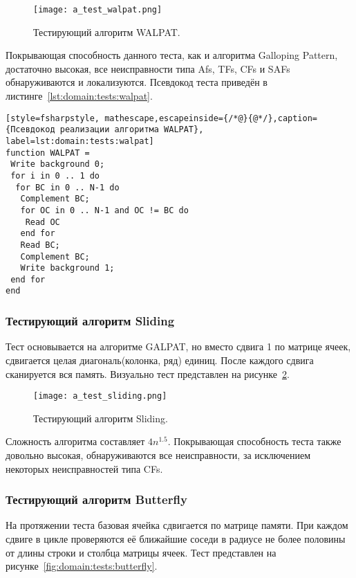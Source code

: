 \begin{figure}[ht]
\centering
  \texttt{[image: a\_test\_walpat.png]}  
  \caption{ Тестирующий алгоритм WALPAT. }
  \label{fig:domain:tests:walpat}
\end{figure}

Покрывающая способность данного теста, как и алгоритма Galloping Pattern, достаточно высокая, все неисправности типа Afs, TFs, CFs и SAFs обнаруживаются и локализуются. Псевдокод теста приведён в листинге~\ref{lst:domain:tests:walpat}.

\begin{lstlisting}[style=fsharpstyle, mathescape,escapeinside={/*@}{@*/},caption={Псевдокод реализации алгоритма WALPAT}, label=lst:domain:tests:walpat]
function WALPAT =
 Write background 0;
 for i in 0 .. 1 do
  for BC in 0 .. N-1 do
   Complement BC;
   for OC in 0 .. N-1 and OC != BC do
    Read OC
   end for
   Read BC;
   Complement BC;
   Write background 1;
 end for
end
\end{lstlisting}

\subsubsection{Тестирующий алгоритм Sliding}
\label{sub:domain:tests:sliding}
Тест основывается на алгоритме GALPAT, но вместо сдвига 1 по матрице ячеек, сдвигается целая диагональ(колонка, ряд) единиц. После каждого сдвига сканируется вся память. Визуально тест представлен на рисунке~\ref{fig:domain:tests:sliding}.

\begin{figure}[ht]
\centering
  \texttt{[image: a\_test\_sliding.png]}  
  \caption{ Тестирующий алгоритм Sliding. }
  \label{fig:domain:tests:sliding}
\end{figure} 

Сложность алгоритма составляет $ 4n^{1.5} $. Покрывающая способность теста также довольно высокая, обнаруживаются все неисправности, за исключением некоторых неисправностей типа CFs.

\subsubsection{Тестирующий алгоритм Butterfly}
\label{sub:domain:tests:butterfly}
На протяжении теста базовая ячейка сдвигается по матрице памяти. При каждом сдвиге в цикле проверяются её ближайшие соседи в радиусе не более половины от длины строки и столбца матрицы ячеек. Тест представлен на рисунке~\ref{fig:domain:tests:butterfly}. 

